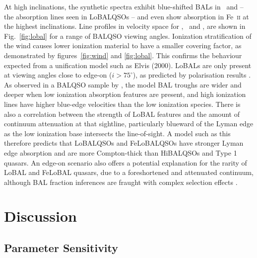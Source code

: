 At high inclinations, the synthetic spectra exhibit 
blue-shifted BALs in \al\ and \mg --
the absorption lines seen in LoBALQSOs -- 
and even show absorption in Fe~\textsc{ii}
at the highest inclinations. Line profiles in velocity space 
for \civ, \al\ and \mg, are shown in Fig.~\ref{fig:lobal} for a range
of BALQSO viewing angles. Ionization stratification
of the wind causes lower ionization material to have a 
smaller covering factor, 
as demonstrated by figures~\ref{fig:wind} and \ref{fig:lobal}.
This confirms the behaviour expected from a unification model such as Elvis (2000). 
LoBALs are only present at viewing angles close to edge-on ($i>75^\circ$),
as predicted by polarisation results \citep{brotherton1997}.
As observed in a BALQSO sample by \cite{filizak2014}, 
the model BAL troughs are wider and deeper when low ionization 
absorption features are present,
and high ionization lines have higher blue-edge velocities than the 
low ionization species.
There is also a correlation between the strength of LoBAL features
and the amount of continuum attenuation at that sightline, particularly
blueward of the Lyman edge as the low ionization base 
intersects the line-of-sight. 
A model such as this therefore predicts that LoBALQSOs and FeLoBALQSOs 
have stronger Lyman edge absorption and 
are more Compton-thick than HiBALQSOs and Type 1 quasars.
An edge-on scenario also offers a potential explanation for the rarity of LoBAL and
FeLoBAL quasars, due to a foreshortened and attenuated continuum, 
although BAL fraction inferences are fraught with complex selection 
effects \citep{goodrich1997,krolikvoit1998}.


\section{Discussion}
\label{sec:qso_discuss}

\subsection{Parameter Sensitivity}
\label{sec:param_sens}

